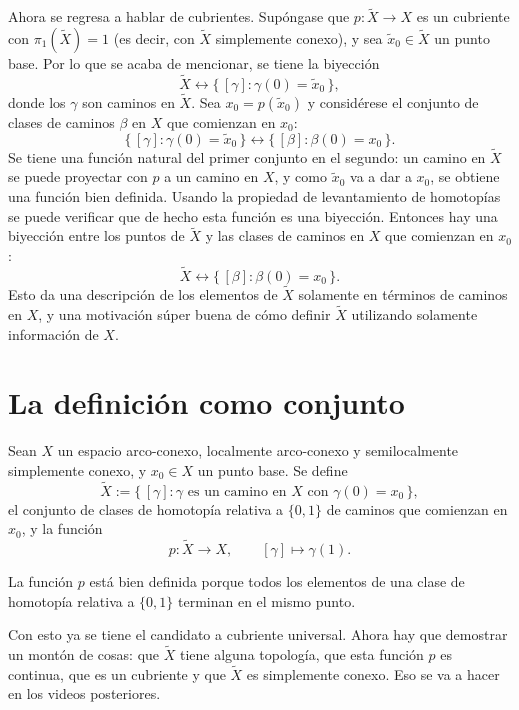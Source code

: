 \documentclass[11pt]{article}
\begin{document}
Ahora se regresa a hablar de cubrientes. Supóngase que $p\colon\tilde X\to X$ es un cubriente con $\pi_1(\tilde X)=1$ (es decir, con $\tilde X$ simplemente conexo), y sea $\tilde x_0\in\tilde X$ un punto base. Por lo que se acaba de mencionar, se tiene la biyección
\[
  \tilde X\longleftrightarrow\{\,[\gamma]:\gamma(0)=\tilde x_0\,\},
\]
donde los $\gamma$ son caminos en $\tilde X$. Sea $x_0=p(\tilde x_0)$ y considérese el conjunto de clases de caminos $\beta$ en $X$ que comienzan en $x_0$:
\[
  \{\,[\gamma]:\gamma(0)=\tilde x_0\,\}\longleftrightarrow\{\,[\beta]:\beta(0)=x_0\,\}.
\]
Se tiene una función natural del primer conjunto en el segundo: un camino en $\tilde X$ se puede proyectar con $p$ a un camino en $X$, y como $\tilde x_0$ va a dar a $x_0$, se obtiene una función bien definida. Usando la propiedad de levantamiento de homotopías se puede verificar que de hecho esta función es una biyección. Entonces hay una biyección entre los puntos de $\tilde X$ y las clases de caminos en $X$ que comienzan en $x_0$:
\[
  \tilde X\longleftrightarrow\{\,[\beta]:\beta(0)=x_0\,\}.
\]
Esto da una descripción de los elementos de $\tilde X$ solamente en términos de caminos en $X$, y una motivación súper buena de cómo definir $\tilde X$ utilizando solamente información de $X$.

\section*{La definición como conjunto}

\begin{defn}\label{def:xtilde}
Sean $X$ un espacio arco-conexo, localmente arco-conexo y semilocalmente simplemente conexo, y $x_0\in X$ un punto base. Se define
\[
  \tilde X:=\{\,[\gamma]:\gamma\text{ es un camino en }X\text{ con }\gamma(0)=x_0\,\},
\]
el conjunto de clases de homotopía relativa a $\{0,1\}$ de caminos que comienzan en $x_0$, y la función
\[
  p\colon\tilde X\to X,\qquad [\gamma]\longmapsto\gamma(1).
\]
\end{defn}

La función $p$ está bien definida porque todos los elementos de una clase de homotopía relativa a $\{0,1\}$ terminan en el mismo punto.

Con esto ya se tiene el candidato a cubriente universal. Ahora hay que demostrar un montón de cosas: que $\tilde X$ tiene alguna topología, que esta función $p$ es continua, que es un cubriente y que $\tilde X$ es simplemente conexo. Eso se va a hacer en los videos posteriores.
\end{document}

